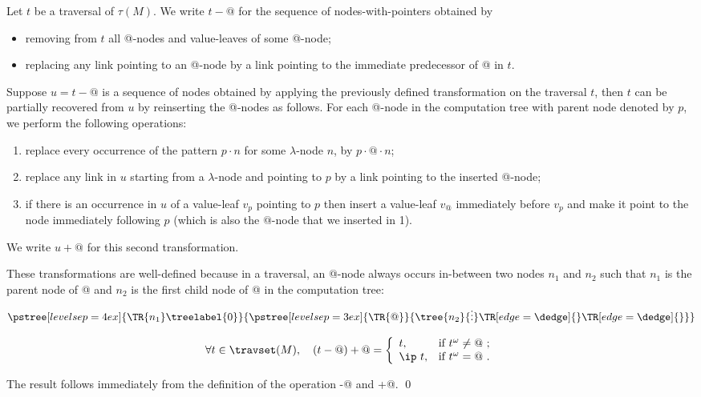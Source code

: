 \begin{definition}
\label{dfn:appnode_filter} Let $t$ be a traversal of $\tau(M)$. We
write $t-@$ for the sequence of nodes-with-pointers obtained by
\begin{itemize}
\item removing from $t$ all @-nodes and value-leaves of some @-node;
\item replacing any link pointing to an @-node by a link pointing to the immediate predecessor of @ in $t$.
\end{itemize}

Suppose $u = t-@$ is a sequence of nodes obtained by applying the
previously defined transformation on the traversal $t$, then $t$ can
be partially recovered from $u$ by reinserting the @-nodes as
follows. For each @-node in the computation tree with parent node
denoted by $p$, we perform the following operations:
\begin{enumerate}
\item replace every occurrence of the pattern $p \cdot n$ for some $\lambda$-node
$n$,
by $p \cdot @ \cdot n$;
\item replace any link in $u$ starting from a $\lambda$-node and pointing to $p$ by a link pointing to the inserted @-node;
\item if there is an occurrence in $u$ of a value-leaf $v_p$ pointing to $p$ then insert a value-leaf $v_@$
immediately before $v_p$ and make it point to the node
immediately following $p$ (which is also the $@$-node that we
inserted in 1).
\end{enumerate}
We write $u+@$ for this second transformation.
\end{definition}
These transformations are well-defined because in a traversal, an
@-node always occurs in-between two nodes $n_1$ and $n_2$ such that
$n_1$ is the parent node of @ and $n_2$ is the first child node of @
in the computation tree:
$$      \pstree[levelsep=4ex]{\TR{n_1}\treelabel{0} }
        {
            \pstree[levelsep=3ex]{\TR{@}}
            {
                \tree{n_2}{\vdots}
                \TR[edge=\dedge]{}
                \TR[edge=\dedge]{}
            }
        }
$$
\begin{lemma} \label{lem:minus_at_plus_at}
$$\forall t \in \travset(M), \quad (t-@)+@ = \left\{
            \begin{array}{ll}
              t, & \hbox{if $t^\omega \neq @$\ ;} \\
              \ip\ t, & \hbox{if $t^\omega = @$\ .}
            \end{array}
          \right.
$$
\end{lemma}
\proof The result follows immediately from the definition of the
operation -@ and +@. \qed
\bigskip

